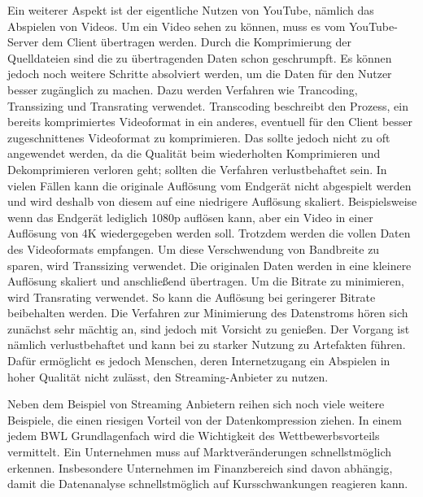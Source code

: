 Ein weiterer Aspekt ist der eigentliche Nutzen von YouTube, nämlich das Abspielen von Videos.
Um ein Video sehen zu können, muss es vom YouTube-Server dem Client übertragen werden.
Durch die Komprimierung der Quelldateien sind die zu übertragenden Daten schon geschrumpft.
Es können jedoch noch weitere Schritte absolviert werden, um die Daten für den Nutzer besser zugänglich zu machen.
Dazu werden Verfahren wie Trancoding, Transsizing und Transrating verwendet.
Transcoding beschreibt den Prozess, ein bereits komprimiertes Videoformat in ein anderes, eventuell für den Client besser zugeschnittenes Videoformat zu komprimieren.
Das sollte jedoch nicht zu oft angewendet werden, da die Qualität beim wiederholten Komprimieren und Dekomprimieren verloren geht; sollten die Verfahren verlustbehaftet sein. \newline
In vielen Fällen kann die originale Auflösung vom Endgerät nicht abgespielt werden und wird deshalb von diesem auf eine niedrigere Auflösung skaliert.
Beispielsweise wenn das Endgerät lediglich 1080p auflösen kann, aber ein Video in einer Auflösung von 4K wiedergegeben werden soll.
Trotzdem werden die vollen Daten des Videoformats empfangen.
Um diese Verschwendung von Bandbreite zu sparen, wird Transsizing verwendet.
Die originalen Daten werden in eine kleinere Auflösung skaliert und anschließend übertragen. \newline
Um die Bitrate zu minimieren, wird Transrating verwendet.
So kann die Auflösung bei geringerer Bitrate beibehalten werden.
Die Verfahren zur Minimierung des Datenstroms hören sich zunächst sehr mächtig an, sind jedoch mit Vorsicht zu genießen.
Der Vorgang ist nämlich verlustbehaftet und kann bei zu starker Nutzung zu Artefakten führen.
Dafür ermöglicht es jedoch Menschen, deren Internetzugang ein Abspielen in hoher Qualität nicht zulässt, den Streaming-Anbieter zu nutzen. \newline

Neben dem Beispiel von Streaming Anbietern reihen sich noch viele weitere Beispiele, die einen riesigen Vorteil von der Datenkompression ziehen.
In einem jedem BWL Grundlagenfach wird die Wichtigkeit des Wettbewerbsvorteils vermittelt.
Ein Unternehmen muss auf Marktveränderungen schnellstmöglich erkennen.
Insbesondere Unternehmen im Finanzbereich sind davon abhängig, damit die Datenanalyse schnellstmöglich auf Kursschwankungen reagieren kann.

